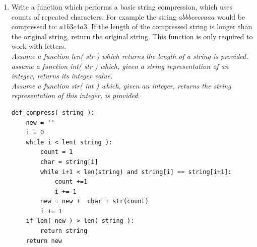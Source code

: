 \documentclass[11pt]{article}
\newenvironment{answer}{\large\lstset{basicstyle=\large}\color{white}}{}
\newenvironment{answer}{\large\lstset{basicstyle=\large}\color{red}}{}
\begin{document}
\begin{enumerate}
\item Write a function which performs a basic string compression, which uses counts of repeated characters. For example 
the string $abbbccccaaa$ would be compressed to: $a1b3c4a3$. If the length of the compressed string is longer than the original 
string, return the original string. This function is only required to work with letters.\\
 \emph{Assume a function len( str ) which returns the length of a string is provided. \\
      assume a function int( str ) which, given a string representation of an integer, returns its integer value. \\
      Assume a function str( int ) which, given an integer, returns the string representation of this integer, is provided. }

\begin{answer}
\begin{lstlisting}
def compress( string ):
    new = ''
    i = 0
    while i < len( string ):
        count = 1
        char = string[i]
        while i+1 < len(string) and string[i] == string[i+1]:
            count +=1
            i += 1
        new = new +  char + str(count)
        i += 1
    if len( new ) > len( string ):
        return string 
    return new
\end{lstlisting}
\end{answer}
 \end{enumerate}
\end{document}
